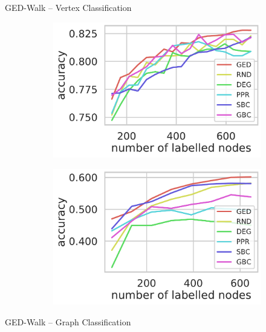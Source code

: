 \documentclass[10pt,titlepage,english,presentation]{beamer}
\begin{document}
\begin{frame}{GED-Walk -- Vertex Classification}
\begin{figure}
\begin{subfigure}[t]{.5\textwidth}
\centering
\includegraphics[width=.9\textwidth]{../sources/plots/ged-walk/node_classification_cora_ml.pdf}
\end{subfigure}\hfill
\begin{subfigure}[t]{.5\textwidth}
\centering
\includegraphics[width=.9\textwidth]{../sources/plots/ged-walk/node_classification_wiki.pdf}
\end{subfigure}
\end{figure}
\end{frame}

\begin{frame}{GED-Walk -- Graph Classification}
\scriptsize
\centering\vspace{-3mm}

\begin{table}
\centering
\caption*{\scriptsize Graph classification accuracy in \%.}
\vspace{-1mm}

\end{table}
\end{frame}
\end{document}
